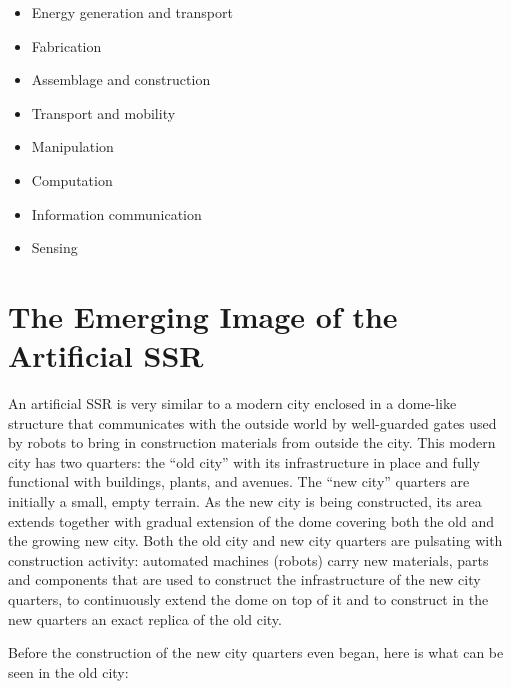 \begin{itemize}
\begin{itemize}
\begin{itemize}
\item Energy generation and transport
\item Fabrication
\item Assemblage and construction
\item Transport and mobility
\item Manipulation
\item Computation
\item Information communication
\item Sensing
\end{itemize}
\end{itemize}
\end{itemize}

\section{The Emerging Image of the Artificial SSR}

An artificial SSR is very similar to a modern city enclosed in a
dome-like structure that communicates with the outside world by
well-guarded gates used by robots to bring in construction materials
from outside the city. This modern city has two quarters: the “old
city” with its infrastructure in place and fully functional with
buildings, plants, and avenues. The “new city” quarters are initially a
small, empty terrain. As the new city is being constructed, its area
extends together with gradual extension of the dome covering both the
old and the growing new city. Both the old city and new city quarters
are pulsating with construction activity: automated machines (robots)
carry new materials, parts and components that are used to construct
the infrastructure of the new city quarters, to continuously extend the
dome on top of it and to construct in the new quarters an exact replica
of the old city.

Before the construction of the new city quarters even began, here is
what can be seen in the old city:

